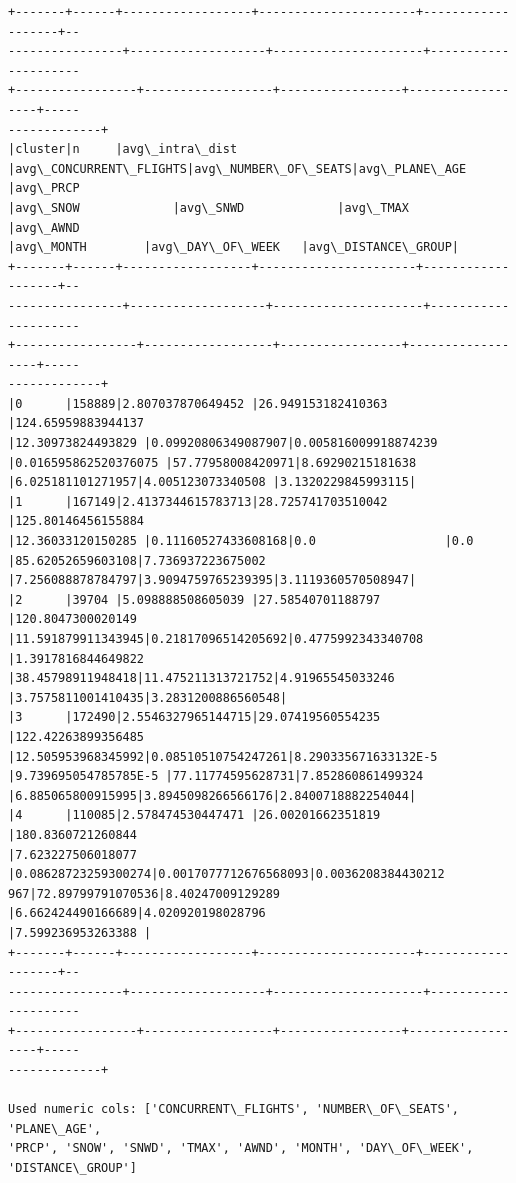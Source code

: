 \documentclass[11pt]{article}
\begin{document}
    \begin{Verbatim}[commandchars=\\\{\}]
+-------+------+------------------+----------------------+-------------------+--
----------------+-------------------+---------------------+---------------------
+-----------------+------------------+-----------------+------------------+-----
-------------+
|cluster|n     |avg\_intra\_dist
|avg\_CONCURRENT\_FLIGHTS|avg\_NUMBER\_OF\_SEATS|avg\_PLANE\_AGE     |avg\_PRCP
|avg\_SNOW             |avg\_SNWD             |avg\_TMAX         |avg\_AWND
|avg\_MONTH        |avg\_DAY\_OF\_WEEK   |avg\_DISTANCE\_GROUP|
+-------+------+------------------+----------------------+-------------------+--
----------------+-------------------+---------------------+---------------------
+-----------------+------------------+-----------------+------------------+-----
-------------+
|0      |158889|2.807037870649452 |26.949153182410363    |124.65959883944137
|12.30973824493829 |0.09920806349087907|0.005816009918874239
|0.016595862520376075 |57.77958008420971|8.69290215181638
|6.025181101271957|4.005123073340508 |3.1320229845993115|
|1      |167149|2.4137344615783713|28.725741703510042    |125.80146456155884
|12.36033120150285 |0.11160527433608168|0.0                  |0.0
|85.62052659603108|7.736937223675002
|7.256088878784797|3.9094759765239395|3.1119360570508947|
|2      |39704 |5.098888508605039 |27.58540701188797     |120.8047300020149
|11.591879911343945|0.21817096514205692|0.4775992343340708   |1.3917816844649822
|38.45798911948418|11.475211313721752|4.91965545033246
|3.7575811001410435|3.2831200886560548|
|3      |172490|2.5546327965144715|29.07419560554235     |122.42263899356485
|12.505953968345992|0.08510510754247261|8.290335671633132E-5
|9.739695054785785E-5 |77.11774595628731|7.852860861499324
|6.885065800915995|3.8945098266566176|2.8400718882254044|
|4      |110085|2.578474530447471 |26.00201662351819     |180.8360721260844
|7.623227506018077 |0.08628723259300274|0.0017077712676568093|0.0036208384430212
967|72.89799791070536|8.40247009129289  |6.662424490166689|4.020920198028796
|7.599236953263388 |
+-------+------+------------------+----------------------+-------------------+--
----------------+-------------------+---------------------+---------------------
+-----------------+------------------+-----------------+------------------+-----
-------------+

Used numeric cols: ['CONCURRENT\_FLIGHTS', 'NUMBER\_OF\_SEATS', 'PLANE\_AGE',
'PRCP', 'SNOW', 'SNWD', 'TMAX', 'AWND', 'MONTH', 'DAY\_OF\_WEEK',
'DISTANCE\_GROUP']
    \end{Verbatim}
\end{document}
